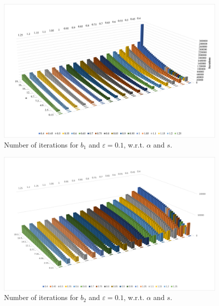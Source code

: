 \begin{figure}
\begin{center}
\includegraphics[scale=.55]{Iter-eps01-d1.png}
\end{center}
\caption{Number of iterations for $b_1$ and $\varepsilon=0.1$, w.r.t. $\alpha$ and $s$.}\label{res_iter01d1}
\end{figure}
\begin{figure}
\begin{center}
\includegraphics[scale=.55]{Iter-eps01-d2.png} 
\end{center}
\caption{Number of iterations for $b_2$ and $\varepsilon=0.1$, w.r.t. $\alpha$ and $s$.}\label{res_iter01d2}
\end{figure}


